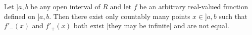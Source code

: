 Let $]a, b$ be any open interval of $R$ and let $f$ be an arbitrary real-valued function defined on $]a, b$. Then there exist only countably many points $x \in ]a, b$ such that $f'_-(x)$ and $f'_+(x)$ both exist [they may be infinite] and are not equal.